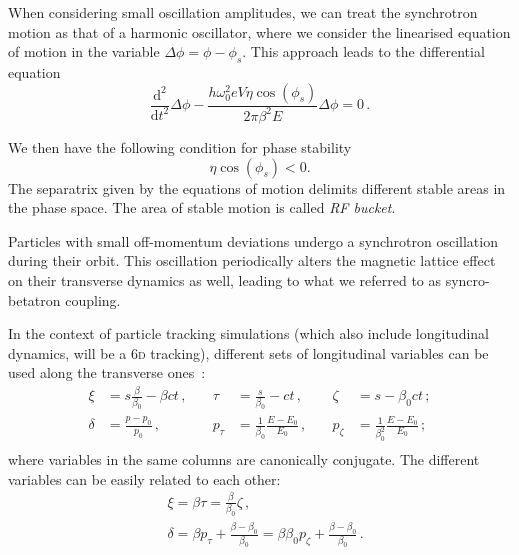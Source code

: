 When considering small oscillation amplitudes, we can treat the synchrotron motion as that of a harmonic oscillator, where we consider the linearised equation of motion in the variable $\Delta \phi=\phi-\phi_s$. This approach leads to the differential equation
\begin{equation}
    \frac{\mathrm{d}^2}{\mathrm{d} t^2} \Delta \phi-\frac{h \omega_0^2 e V \eta \cos \left(\phi_s\right)}{2 \pi \beta^2 E} \Delta \phi=0 \,.
\end{equation}

We then have the following condition for phase stability
\begin{equation}
    \eta \cos \left(\phi_s\right)<0 .
\end{equation}
The separatrix given by the equations of motion delimits different stable areas in the phase space. The area of stable motion is called \textit{RF bucket}. %

Particles with small off-momentum deviations undergo a synchrotron oscillation during their orbit. This oscillation periodically alters the magnetic lattice effect on their transverse dynamics as well, leading to what we referred to as syncro-betatron coupling.

In the context of particle tracking simulations (which also include longitudinal dynamics, will be a 6\textsc{d} tracking), different sets of longitudinal variables can be used along the transverse ones~\cite{xsuite:physics}:
\begin{equation}
    \begin{aligned}
    \xi &= s \frac{\beta}{\beta_0}-\beta c t \,,\quad& \tau &= \frac{s}{\beta_0}-c t \,,\quad& \zeta &= s-\beta_0 c t \,;\\
    \delta &= \frac{p-p_0}{p_0} \,,\quad& p_\tau &= \frac{1}{\beta_0} \frac{E-E_0}{E_0} \,,\quad& p_\zeta &= \frac{1}{\beta_0^2} \frac{E-E_0}{E_0}\,; \\
    \end{aligned}
\end{equation}
where variables in the same columns are canonically conjugate.
The different variables can be easily related to each other:
\begin{equation}
    \begin{aligned}
    &\xi=\beta \tau=\frac{\beta}{\beta_0} \zeta \,,\\
    &\delta=\beta p_\tau+\frac{\beta-\beta_0}{\beta_0}=\beta \beta_0 p_\zeta+\frac{\beta-\beta_0}{\beta_0} \,.
    \end{aligned}
\end{equation}

